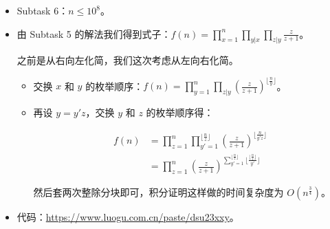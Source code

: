 \documentclass[10pt,aspectratio=43,mathserif]{beamer}
\begin{document}
\begin{frame}

	\begin{itemize} \setlength{\parskip}{0.15\baselineskip}

		\item Subtask 6：$n\leq 10^8$。

		\item 由 Subtask 5 的解法我们得到式子：$f(n)=\prod_{x=1}^n\prod_{y|x}\prod_{z|y}\frac z{z+1}$。

		之前是从右向左化简，我们这次考虑从左向右化简。

		\begin{itemize} \setlength{\parskip}{0.15\baselineskip}

			\item 交换 $x$ 和 $y$ 的枚举顺序：$f(n)=\prod_{y=1}^n\prod_{z|y}(\frac z{z+1})^{\lfloor\frac ny\rfloor}$。

			\item 再设 $y=y'z$，交换 $y$ 和 $z$ 的枚举顺序得：
			
			$$\begin{aligned}f(n)&=\prod_{z=1}^n\prod_{y'=1}^{\lfloor\frac nz\rfloor}(\frac z{z+1})^{\lfloor\frac n{y'z}\rfloor}\\&=\prod_{z=1}^n(\frac z{z+1})^{\sum_{y'=1}^{\lfloor\frac nz\rfloor}\lfloor\frac{\lfloor\frac nz\rfloor}{y'}\rfloor}\end{aligned}$$
			
			然后套两次整除分块即可，积分证明这样做的时间复杂度为 $O(n^{\frac 34})$。

		\end{itemize}

		\item 代码：\url{https://www.luogu.com.cn/paste/dsu23xxy}。

	\end{itemize}

\end{frame}
			
\end{document}
